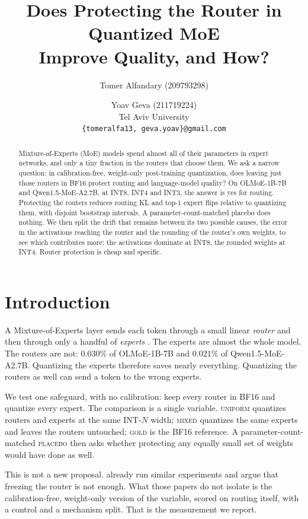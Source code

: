 \documentclass[11pt]{article}
\title{Does Protecting the Router in Quantized MoE\\
  Improve Quality, and How?}
\author{Tomer Alfandary (209793298) \and Yoav Geva (211719224) \\
  Tel Aviv University \\
  \texttt{\{tomeralfa13, geva.yoav\}@gmail.com}}
\newcommand{\gold}{\textsc{gold}}
\newcommand{\uniform}{\textsc{uniform}}
\newcommand{\mixed}{\textsc{mixed}}
\newcommand{\placebo}{\textsc{placebo}}
\begin{document}
\maketitle
\begin{abstract}
Mixture-of-Experts (MoE) models spend almost all of their parameters in expert
networks, and only a tiny fraction in the routers that choose them. We ask a
narrow question: in calibration-free, weight-only post-training quantization,
does leaving just those routers in BF16 protect routing and language-model
quality? On OLMoE-1B-7B and Qwen1.5-MoE-A2.7B, at INT8, INT4 and INT3, the
answer is yes for routing. Protecting the routers reduces routing KL and top-1
expert flips relative to quantizing them, with disjoint
bootstrap intervals. A parameter-count-matched placebo does nothing. We
then split the drift that remains between its two possible causes, the error in
the activations reaching the router and the rounding of the router's own
weights, to see which contributes more: the activations dominate at INT8, the
rounded weights at INT4. Router protection is cheap and specific. 
\end{abstract}

\section{Introduction}
\label{sec:intro}

A Mixture-of-Experts layer sends each token through a small linear
\emph{router} and then through only a handful of \emph{experts}
\citep{shazeer2017outrageously,fedus2022switch,jiang2024mixtral}. The experts
are almost the whole model. The routers are not: $0.030\%$ of OLMoE-1B-7B and
$0.021\%$ of Qwen1.5-MoE-A2.7B. Quantizing the experts therefore saves nearly
everything. Quantizing the routers as well can send a token to the wrong
experts.

We test one safeguard, with no calibration: keep every router in BF16 and
quantize every expert. The comparison is a single variable. \uniform{}
quantizes routers and experts at the same INT-$N$ width; \mixed{} quantizes
the same experts and leaves the routers untouched; \gold{} is the BF16
reference. A parameter-count-matched \placebo{} then asks whether protecting
any equally small set of weights would have done as well.

This is not a new proposal. \citet{fu2025eaquant} already run similar experiments and \citet{routequant2026} argue that freezing the
router is not enough. What those papers do not isolate is the
calibration-free, weight-only version of the variable, scored on routing
itself, with a control and a mechanism split. That is the measurement we
report.
\end{document}
